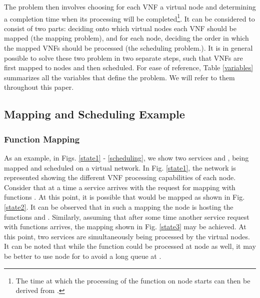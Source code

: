 \documentclass[conference]{IEEEtran}
\begin{document}
\indent The problem then involves choosing for each VNF  a virtual node  and determining a completion time  when its processing will be completed\footnote{The time  at which the processing of the function  on node  starts can then be derived from .}. It can be considered to consist of two parts: deciding onto which virtual nodes each VNF should be mapped (the mapping problem), and for each node, deciding the order in which the mapped VNFs should be processed (the scheduling problem.). It is in general possible to solve these two problem in two separate steps, such that VNFs are first mapped to nodes and then scheduled. For ease of reference, Table \ref{variables} summarizes all the variables that define the problem. We will refer to them throughout this paper.



\subsection{Mapping and Scheduling Example}
\subsubsection{Function Mapping}
As an example, in Figs. \ref{state1} - \ref{scheduling}, we show two services  and , being mapped and scheduled on a virtual network. In Fig. \ref{state1}, the network is represented showing the different VNF processing capabilities of each node. Consider that at a time  a service  arrives with the request for mapping with functions . At this point, it is possible that  would be mapped as shown in Fig. \ref{state2}. It can be observed that in such a mapping the node  is hosting the functions  and . Similarly, assuming that after some time another service request  with functions  arrives, the mapping shown in Fig. \ref{state3} may be achieved. At this point, two services are simultaneously being processed by the virtual nodes. It can be noted that while the function  could be processed at node  as well, it may be better to use node  for  to avoid a long queue at .
\end{document}
